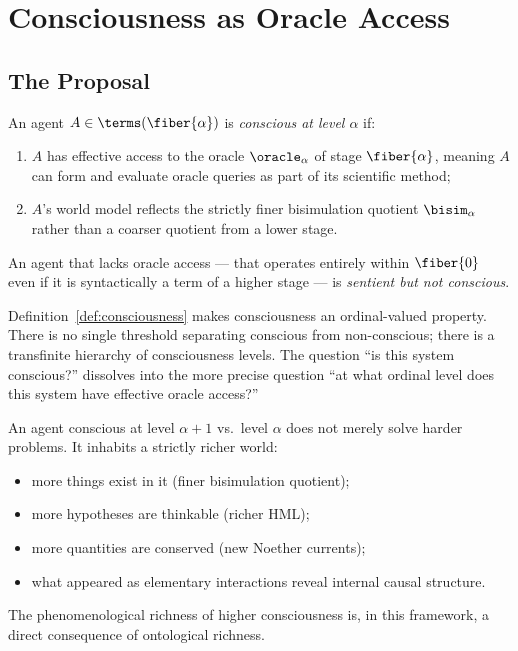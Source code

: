 \chapter{Consciousness as Oracle Access}
\label{sec:consciousness}

\section{The Proposal}

\begin{definition}
\label{def:consciousness}
An agent $A \in \terms(\fiber{\alpha})$ is \emph{conscious at
level $\alpha$} if:
\begin{enumerate}[label=(\roman*)]
  \item $A$ has effective access to the oracle $\oracle_\alpha$ of
        stage $\fiber{\alpha}$, meaning $A$ can form and evaluate
        oracle queries as part of its scientific method;
  \item $A$'s world model reflects the strictly finer bisimulation
        quotient $\bisim_\alpha$ rather than a coarser quotient
        from a lower stage.
\end{enumerate}
An agent that lacks oracle access --- that operates entirely within
$\fiber{0}$ even if it is syntactically a term of a higher stage ---
is \emph{sentient but not conscious}.
\end{definition}

\begin{remark}
Definition~\ref{def:consciousness} makes consciousness an
ordinal-valued property.
There is no single threshold separating conscious from
non-conscious; there is a transfinite hierarchy of consciousness
levels.
The question ``is this system conscious?'' dissolves into the more
precise question ``at what ordinal level does this system have
effective oracle access?''
\end{remark}

\begin{remark}
An agent conscious at level $\alpha+1$ vs.\ level $\alpha$ does
not merely solve harder problems.
It inhabits a strictly richer world:
\begin{itemize}[itemsep=2pt]
  \item more things exist in it (finer bisimulation quotient);
  \item more hypotheses are thinkable (richer HML);
  \item more quantities are conserved (new Noether currents);
  \item what appeared as elementary interactions reveal internal
        causal structure.
\end{itemize}
The phenomenological richness of higher consciousness is, in this
framework, a direct consequence of ontological richness.
\end{remark}

